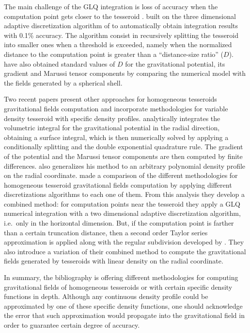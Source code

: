 \documentclass[extra, referee]{gji}
\begin{document}
The main challenge of the GLQ integration is loss of accuracy when the computation point
gets closer to the tesseroid \citep{Ku1977}.
\citet{Uieda2016} built on the three dimensional adaptive discretization algorithm of
\citet{Li2011} to automatically obtain integration results with 0.1\% accuracy.
The algorithm consist in recursively splitting the tesseroid into smaller ones when a
threshold is exceeded,
namely when the normalized distance to the computation point is greater than a
``distance-size ratio'' ($D$).
\citet{Uieda2016} have also obtained standard values of $D$
for the gravitational potential, its gradient and Marussi tensor components
by comparing the numerical model with the fields generated by a spherical shell.

Two recent papers present other approaches for homogeneous tesseroids gravitational
fields computation and incorporate methodologies for variable density tesseroid with
specific density profiles.
\citet{Fukushima2018} analytically integrates the volumetric integral for the
gravitational potential in the radial direction, obtaining a surface integral, which is
then numerically solved by applying a conditionally splitting and the double exponential
quadrature rule. The gradient of the potential and the Marussi tensor components are
then computed by finite differences. \citet{Fukushima2018} also generalizes his method
to an arbitrary polynomial density profile on the radial coordinate.
\citet{Lin2018} made a comparison of the different methodologies for homogeneous
tesseroid gravitational fields computation by applying different discretizations
algorithms to each one of them.
From this analysis they develop a combined method:
for computation points near the tesseroid they apply a GLQ numerical integration with
a two dimensional adaptive discretization algorithm, i.e.~only in the horizontal
dimension. But, if the computation point is farther than a certain truncation distance,
then a second order Taylor series approximation is applied along with the regular
subdivision developed by \citet{Grombein2013}.
They also introduce a variation of their combined method to compute the gravitational
fields generated by tesseroids with linear density on the radial coordinate.

In summary, the bibliography is offering different methodologies for computing
gravitational fields of homogeneous tesseroids or with certain specific density
functions in depth.
Although any continuous density profile could be approximated by one of these specific
density functions, one should acknowledge the error that such approximation would
propagate into the gravitational field in order to guarantee certain degree of accuracy.
\end{document}
